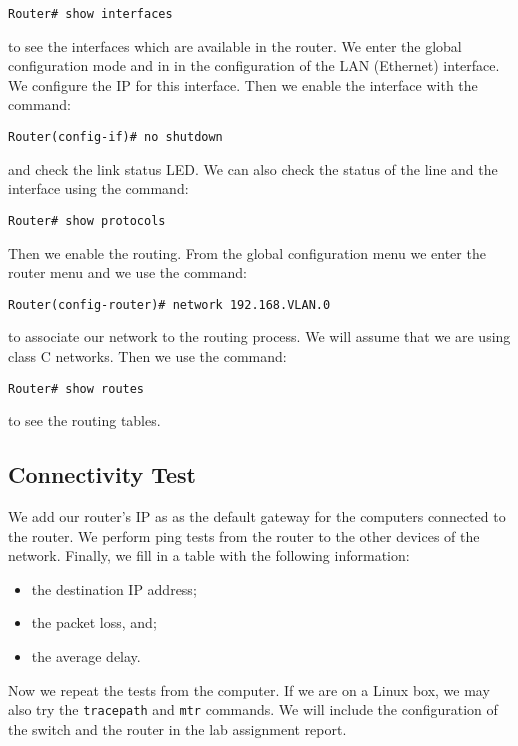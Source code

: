 \begin{lstlisting}
Router# show interfaces
\end{lstlisting}

to see the interfaces which are available in the router. We enter the global configuration mode and in in the configuration of the LAN (Ethernet) interface. We configure the IP for this interface. Then we enable the interface with the command:

\begin{lstlisting}
Router(config-if)# no shutdown
\end{lstlisting}

and check the link status LED. We can also check the status of the line and the interface using the command:

\begin{lstlisting}
Router# show protocols
\end{lstlisting}

Then we enable the routing. From the global configuration menu we enter the router menu and we use the command:

\begin{lstlisting}
Router(config-router)# network 192.168.VLAN.0
\end{lstlisting}

to associate our network to the routing process. We will assume that we are using class C networks. Then we use the command:

\begin{lstlisting}
Router# show routes
\end{lstlisting}

to see the routing tables.

\subsection{Connectivity Test}

We add our router's IP as as the default gateway for the computers connected to the router. We perform ping tests from the router to the other devices of the network. Finally, we fill in a table with the following information:

\begin{itemize}
\item the destination IP address;
\item the packet loss, and;
\item the average delay.
\end{itemize}

Now we repeat the tests from the computer. If we are on a Linux box, we may also try the \texttt{\color{blue}tracepath} and \texttt{\color{blue}mtr} commands. We will include the configuration of the switch and the router in the lab assignment report.

